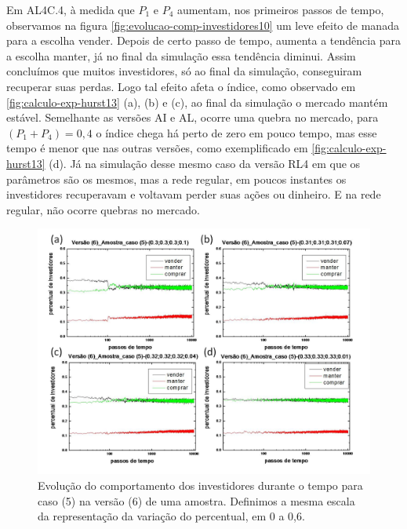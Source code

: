 \documentclass[brazil,ruledheader]{abnt}
\begin{document}
Em AL4C.4, à medida que $P_1$ e $P_4$ aumentam, nos primeiros
passos de tempo, observamos na figura \ref{fig:evolucao-comp-investidores10} um
leve efeito de manada para a escolha vender. Depois de certo passo de tempo,
aumenta a tendência para a escolha manter, já no final da simulação essa
tendência diminui. Assim concluímos que muitos investidores, só ao final da
simulação, conseguiram recuperar suas perdas. Logo tal efeito afeta o índice,
como observado em \ref{fig:calculo-exp-hurst13} (a), (b) e (c), ao final da
simulação o mercado mantém estável. Semelhante as versões AI e AL, ocorre uma
quebra no mercado, para $(P_1+ P_4)=0,4$  o índice chega há perto de zero em
pouco tempo,
mas esse tempo é menor que nas outras versões, como exemplificado em
\ref{fig:calculo-exp-hurst13} (d). Já na simulação desse mesmo caso da
versão RL4 em que os parâmetros são os mesmos, mas a rede regular, em poucos
instantes os investidores recuperavam e voltavam perder suas ações ou dinheiro.
E na rede regular, não ocorre quebras no mercado.

\begin{figure}[!h]
\centering
\includegraphics[width=.7\linewidth]{Figuras/39.jpg}
\caption{Evolução do comportamento dos investidores durante o tempo para caso
(5) na  versão (6) de uma amostra. Definimos a mesma escala da representação da
variação do percentual, em 0 a 0,6.  }
\label{fig:evolucao-comp-investidores11}
\end{figure}
\end{document}
